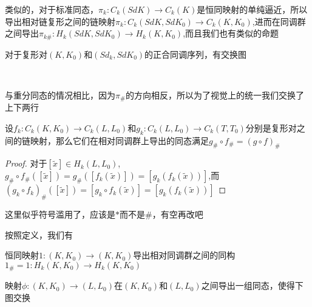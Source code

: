 类似的，对于标准同态，$\pi_{k}:C_{k}(SdK)\rightarrow C_{k}(K)$是恒同映射的单纯逼近，所以导出相对链复形之间的链映射$\pi_{k}:C_{k}(SdK,SdK_{0})\rightarrow C_{k}(K,K_{0})$,进而在同调群之间导出$\pi_{k\#}:H_{k}(SdK,SdK_{0})\rightarrow H_{k}(K,K_{0})$,而且我们也有类似的命题
\begin{proposition}
对于复形对$(K,K_{0})$和$(Sd_{k},SdK_{0})$的正合同调序列，有交换图
{
\center
{}\\
}
\end{proposition}
\begin{remark}
与重分同态的情况相比，因为$\pi_{\#}$的方向相反，所以为了视觉上的统一我们交换了上下两行
\end{remark}
\begin{proposition}\label{chap3_pro_445}
设$f_{k}:C_{k}(K,K_{0})\rightarrow C_{k}(L,L_{0})$和$g_{k}:C_{k}(L,L_{0})\rightarrow C_{k}(T,T_{0})$分别是复形对之间的链映射，那么它们在相对同调群上导出的同态满足$g_{\#}\circ f_{\#}=(g\circ f)_{\#}$
\end{proposition}
\begin{proof}
对于$[\tilde{x}]\in H_{k}(L,L_{0})$,$g_{\#}\circ f_{\#}([\tilde{x}])=g_{\#}([f_{k}(\tilde{x})])=[g_{k}(f_{k}(\tilde{x}))]$,而$(g_{k}\circ f_{k})_{\#}([\tilde{x}])=[g_{k}\circ f_{k}(\tilde{x})]=[g_{k}(f_{k}(\tilde{x}))]$
\end{proof}
\begin{remark}
这里似乎符号滥用了，应该是$*$而不是$\#$，有空再改吧
\end{remark}
按照定义，我们有
\begin{proposition}\label{chap3_pro_455}
恒同映射$1:(K,K_{0})\rightarrow (K,K_{0})$导出相对同调群之间的同构$1_{\#}=1:H_{k}(K,K_{0})\rightarrow H_{k}(K,K_{0})$
\end{proposition}
\begin{proposition}\label{chap3_pro_458}
映射$\phi:(K,K_{0})\rightarrow (L,L_{0})$在$(K,K_{0})$和$(L,L_{0})$之间导出一组同态，使得下图交换
{
\center{}\\
}
\end{proposition}
